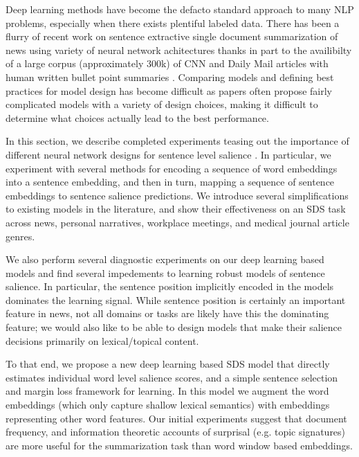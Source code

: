 

Deep learning methods have become the defacto standard approach to many 
NLP problems, especially when there exists plentiful labeled data.
There has been a flurry of recent work on sentence extractive 
single document summarization of news using variety of neural network 
achitectures 
\citep{cheng2016neural,nallapati2016classify,nallapati2016summarunner,narayan2018ranking} 
thanks in part to the availibilty of a large corpus 
(approximately 300k) of CNN and Daily Mail articles with human written bullet 
point summaries \citep{hermann2015teaching}.
Comparing models and defining best practices for model design has become 
difficult as papers often propose fairly complicated models with a variety
of design choices, making it difficult to determine what choices actually
lead to the best performance. 

In this section, we describe completed experiments teasing out the importance
of different neural network designs for sentence level salience 
\cite{kedzie2018deep}. 
In particular, we experiment with several methods for encoding a sequence
of word embeddings into a sentence embedding, and then in turn, mapping
a sequence of sentence embeddings to sentence salience predictions. We 
introduce several simplifications to existing models in the literature, and
show their effectiveness on an SDS task across news, personal narratives,
workplace meetings, and medical journal article genres.

We also perform several diagnostic experiments on our deep learning based 
models and find several impedements to learning robust models of 
sentence salience. In particular, the sentence position implicitly 
encoded in the models dominates the learning signal. While sentence position
is certainly an important feature in news, not all domains or tasks are likely
have this the dominating feature; we would also like to be able to design
models that make their salience decisions primarily on lexical/topical content.

To that end, we propose a new deep learning based SDS model that directly 
estimates individual word level salience scores, and a simple sentence 
selection and margin loss framework for learning. In this model 
we augment the word embeddings (which only capture shallow lexical semantics)
with embeddings representing other word features. Our initial experiments
suggest that document frequency, and information theoretic accounts of 
surprisal (e.g. topic signatures) are more useful for the summarization task
than word window based embeddings.

